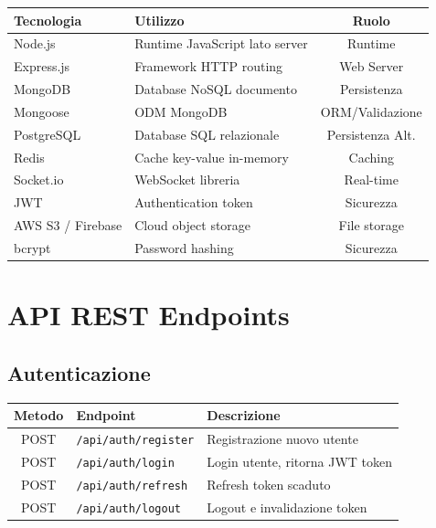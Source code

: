 \documentclass[12pt,a4paper]{report}
\begin{document}
\begin{table}[H]
    \centering
    \begin{tabular}{|l|p{9cm}|c|}
        \hline
        \textbf{Tecnologia} & \textbf{Utilizzo} & \textbf{Ruolo} \\
        \hline
        Node.js & Runtime JavaScript lato server & Runtime \\
        \hline
        Express.js & Framework HTTP routing & Web Server \\
        \hline
        MongoDB & Database NoSQL documento & Persistenza \\
        \hline
        Mongoose & ODM MongoDB & ORM/Validazione \\
        \hline
        PostgreSQL & Database SQL relazionale & Persistenza Alt. \\
        \hline
        Redis & Cache key-value in-memory & Caching \\
        \hline
        Socket.io & WebSocket libreria & Real-time \\
        \hline
        JWT & Authentication token & Sicurezza \\
        \hline
        AWS S3 / Firebase & Cloud object storage & File storage \\
        \hline
        bcrypt & Password hashing & Sicurezza \\
        \hline
    \end{tabular}
\end{table}

\section{API REST Endpoints}

\subsection{Autenticazione}

\begin{table}[H]
    \centering
    \begin{tabular}{|c|l|p{7cm}|}
        \hline
        \textbf{Metodo} & \textbf{Endpoint} & \textbf{Descrizione} \\
        \hline
        POST & \texttt{/api/auth/register} & Registrazione nuovo utente \\
        \hline
        POST & \texttt{/api/auth/login} & Login utente, ritorna JWT token \\
        \hline
        POST & \texttt{/api/auth/refresh} & Refresh token scaduto \\
        \hline
        POST & \texttt{/api/auth/logout} & Logout e invalidazione token \\
        \hline
    \end{tabular}
\end{table}
\end{document}
